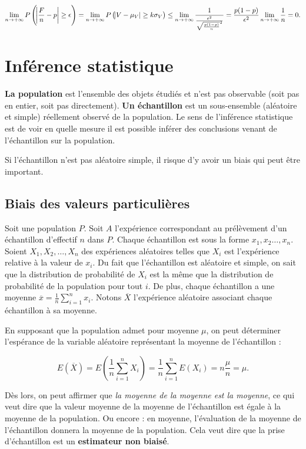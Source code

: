 \documentclass{article}
\begin{document}
		\[\lim_{n\to+\infty}P\left(\abs{\frac Fn - p} \geq \epsilon\right) = \lim_{n\to+\infty}P\left(\abs{V-\mu_V} \geq k\sigma_V\right) \leq \lim_{n\to+\infty}\frac 1{\frac {\epsilon^2}{\sqrt{\frac {p(1-p)}n}^2}} = \frac {p(1-p)}{\epsilon^2}\lim_{n\to+\infty}\frac 1n = 0.\]

\section{Inférence statistique}
	\textbf{La population} est l'ensemble des objets étudiés et n'est pas observable (soit pas en entier, soit pas directement). \textbf{Un échantillon} est un sous-ensemble (aléatoire et simple)
	réellement observé de la population. Le sens de l'inférence statistique est de voir en quelle mesure il est possible inférer des conclusions venant de l'échantillon sur la population.

	Si l'échantillon n'est pas aléatoire simple, il risque d'y avoir un biais qui peut être important.

	\subsection{Biais des valeurs particulières}
		Soit une population $P$. Soit $A$ l'expérience correspondant au prélèvement d'un échantillon d'effectif $n$ dans $P$. Chaque échantillon est sous la forme $x_1, x_2 \ldots, x_n$.
		Soient $X_1, X_2, \ldots, X_n$ des expériences aléatoires telles que $X_i$ est l'expérience relative à la valeur de $x_i$. Du fait que l'échantillon est aléatoire et simple, on
		sait que la distribution de probabilité de $X_i$ est la même que la distribution de probabilité de la population pour tout $i$. De plus, chaque échantillon a une moyenne
		$\overline x = \frac 1n\sum_{i=1}^nx_i$. Notons $\overline X$ l'expérience aléatoire associant chaque échantillon à sa moyenne.

		En supposant que la population admet pour moyenne $\mu$, on peut déterminer l'espérance de la variable aléatoire représentant la moyenne de l'échantillon :

		\[E(\overline X) = E\left(\frac 1n\sum_{i=1}^nX_i\right) = \frac 1n\sum_{i=1}^nE(X_i) = n\frac \mu n = \mu.\]

		Dès lors, on peut affirmer que \textit{la moyenne de la moyenne est la moyenne}, ce qui veut dire que la valeur moyenne de la moyenne de l'échantillon est égale à la moyenne de la population.
		Ou encore : en moyenne, l'évaluation de la moyenne de l'échantillon donnera la moyenne de la population. Cela veut dire que la prise d'échantillon est un \textbf{estimateur non biaisé}.
\end{document}
